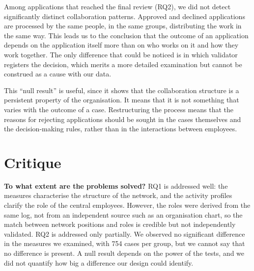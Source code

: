 \documentclass[12pt, a4paper]{article}
\begin{document}
Among applications that reached the final review (RQ2), we did not detect significantly distinct collaboration patterns. Approved and declined applications are processed by the same people, in the same groups, distributing the work in the same way. This leads us to the conclusion that the outcome of an application depends on the application itself more than on who works on it and how they work together. The only difference that could be noticed is in which validator registers the decision, which merits a more detailed examination but cannot be construed as a cause with our data.

This ``null result'' is useful, since it shows that the collaboration structure is a persistent property of the organisation. It means that it is not something that varies with the outcome of a case. Restructuring the process means that the reasons for rejecting applications should be sought in the cases themselves and the decision-making rules, rather than in the interactions between employees.

\section{Critique}
\label{critique}

\textbf{To what extent are the problems solved?} RQ1 is addressed well: the measures characterise the structure of the network, and the activity profiles clarify the role of the central employees. However, the roles were derived from the same log, not from an independent source such as an organisation chart, so the match between network positions and roles is credible but not independently validated. RQ2 is addressed only partially. We observed no significant difference in the measures we examined, with 754 cases per group, but we cannot say that no difference is present. A null result depends on the power of the tests, and we did not quantify how big a difference our design could identify.
\end{document}
